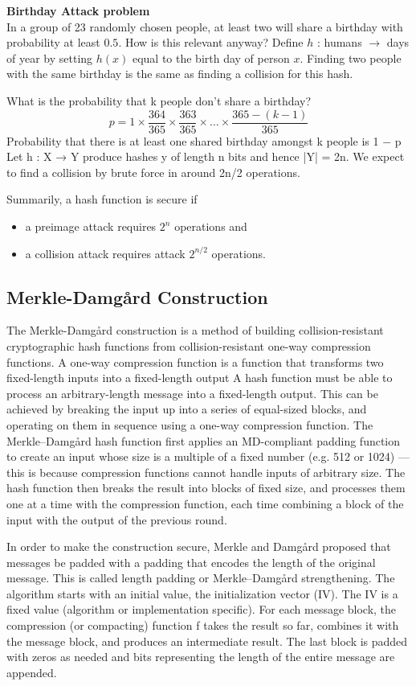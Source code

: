 \textbf{Birthday Attack problem}\\
In a group of 23 randomly chosen people,
at least two will share a birthday with probability at least $0.5$.
How is this relevant anyway?
Define $h$ : humans $\rightarrow$ days of year by setting $h(x)$ equal to the birth day of person $x$.
Finding two people with the same birthday is the same as finding a collision for this hash.

What is the probability that k people don’t share a birthday?
$$
    p = 1 \times \frac{364}{365} \times \frac{363}{365} \times \dots \times \frac{365 - (k - 1)}{365}
$$
Probability that there is at least one shared birthday amongst k people is 1 − p
Let h : X → Y produce hashes y of length n bits and hence |Y| = 2n.
We expect to find a collision by brute force in around 2n/2 operations.

Summarily, a hash function is secure if
\begin{itemize}
    \item a preimage attack requires $2^n$ operations and
    \item a collision attack requires attack $2^{n/2}$ operations.
\end{itemize}


\subsection{Merkle-Damg\aa rd Construction}
The Merkle-Damg\aa rd construction is 
a method of building collision-resistant cryptographic hash functions 
from collision-resistant one-way compression functions.
A one-way compression function is a function
that transforms two fixed-length inputs into a fixed-length output
A hash function must be able to process an arbitrary-length message into a fixed-length output.
This can be achieved by breaking the input up into a series of equal-sized blocks,
and operating on them in sequence using a one-way compression function.
The Merkle–Damgård hash function first applies an MD-compliant padding function to create an input whose size is a multiple of a fixed number (e.g. 512 or 1024) — this is because compression functions cannot handle inputs of arbitrary size. The hash function then breaks the result into blocks of fixed size, and processes them one at a time with the compression function, each time combining a block of the input with the output of the previous round.

In order to make the construction secure, Merkle and Damgård proposed that messages be padded with a padding that encodes the length of the original message. This is called length padding or Merkle–Damgård strengthening.
The algorithm starts with an initial value, the initialization vector (IV). The IV is a fixed value (algorithm or implementation specific). For each message block, the compression (or compacting) function f takes the result so far, combines it with the message block, and produces an intermediate result. The last block is padded with zeros as needed and bits representing the length of the entire message are appended.

